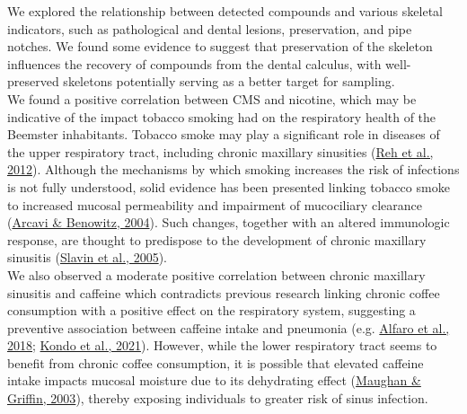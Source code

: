 \documentclass[
  letterpaper,
]{book}
\begin{document}
We explored the relationship between detected compounds and various
skeletal indicators, such as pathological and dental lesions,
preservation, and pipe notches. We found some evidence to suggest that
preservation of the skeleton influences the recovery of compounds from
the dental calculus, with well-preserved skeletons potentially serving
as a better target for sampling.\\
We found a positive correlation between CMS and nicotine, which may be
indicative of the impact tobacco smoking had on the respiratory health
of the Beemster inhabitants. Tobacco smoke may play a significant role
in diseases of the upper respiratory tract, including chronic maxillary
sinusities (\protect\hyperlink{ref-rehImpactTobacco2012}{Reh et al.,
2012}). Although the mechanisms by which smoking increases the risk of
infections is not fully understood, solid evidence has been presented
linking tobacco smoke to increased mucosal permeability and impairment
of mucociliary clearance
(\protect\hyperlink{ref-arcaviCigaretteSmoking2004}{Arcavi \& Benowitz,
2004}). Such changes, together with an altered immunologic response, are
thought to predispose to the development of chronic maxillary sinusitis
(\protect\hyperlink{ref-slavinDiagnosisManagement2005}{Slavin et al.,
2005}).\\
We also observed a moderate positive correlation between chronic
maxillary sinusitis and caffeine which contradicts previous research
linking chronic coffee consumption with a positive effect on the
respiratory system, suggesting a preventive association between caffeine
intake and pneumonia (e.g.
\protect\hyperlink{ref-alfaroChronicCoffee2018}{Alfaro et al., 2018};
\protect\hyperlink{ref-kondoAssociationCoffee2021}{Kondo et al., 2021}).
However, while the lower respiratory tract seems to benefit from chronic
coffee consumption, it is possible that elevated caffeine intake impacts
mucosal moisture due to its dehydrating effect
(\protect\hyperlink{ref-maughanCaffeineIngestion2003}{Maughan \&
Griffin, 2003}), thereby exposing individuals to greater risk of sinus
infection.
\end{document}
